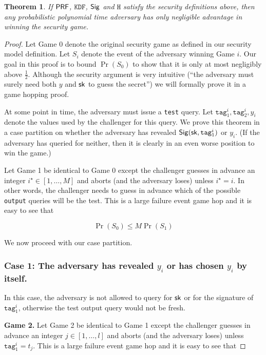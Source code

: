 \documentclass[12pt]{article}
\newtheorem{theorem}{Theorem}[section]
\begin{document}
\begin{theorem}
If $\mathsf{PRF}$, $\texttt{KDF}$, $\mathsf{Sig}$ and $\texttt{H}$ satisfy the security definitions above, then any probabilistic polynomial time adversary has only negligible advantage in winning the security game.
\end{theorem}

\begin{proof}
Let Game 0 denote the original security game as defined in our security model definition. Let $S_i$ denote the event of the adversary winning Game $i$. Our goal in this proof is to bound $\Pr(S_0)$ to show that it is only at most negligibly above $\frac{1}{2}$. Although the security argument is very intuitive (``the adversary must surely need both $y$ and $\mathsf{sk}$ to guess the secret'') we will formally prove it in a game hopping proof.

At some point in time, the adversary must issue a \texttt{test} query. Let $\texttt{tag}_1^i, \texttt{tag}_2^i, y_i$ denote the values used by the challenger for this query. We prove this theorem in a case partition on whether the adversary has revealed $\mathsf{Sig}(\mathsf{sk},\texttt{tag}_1^i)$ or $y_i$. (If the adversary has queried for neither, then it is clearly in an even worse position to win the game.) 

Let Game 1 be identical to Game 0 except the challenger guesses in advance an integer $i^{\star} \in [1, \dots, M]$ and aborts (and the adversary loses) unless $i^{\star} = i$. In other words, the challenger needs to guess in advance which of the possible \texttt{output} queries will be the test. This is a large failure event game hop and it is easy to see that

$$
\Pr(S_0) \le M \Pr(S_1)
$$

\noindent We now proceed with our case partition.

\subsubsection*{Case 1: The adversary has revealed $y_i$ or has chosen $y_i$ by itself.} In this case, the adversary is not allowed to query for $\mathsf{sk}$ or for the signature of $\texttt{tag}_1^i$, otherwise the test output query would not be fresh.

\noindent \textbf{Game 2.} Let Game 2 be identical to Game 1 except the challenger guesses in advance an integer $j \in [1, \dots, l]$ and aborts (and the adversary loses) unless $\texttt{tag}_1^i = t_j$.  This is a large failure event game hop and it is easy to see that


\end{proof}
\end{document}
